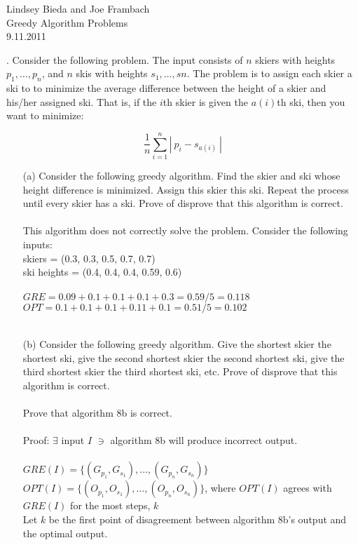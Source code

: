 \documentclass[10pt]{article}
\begin{document}
	\begin{flushright}
	Lindsey Bieda and Joe Frambach\\
	Greedy Algorithm Problems\\
	9.11.2011
	\end{flushright}
	. Consider the following problem.  The input consists of $n$ skiers with heights $p_{1}, \ldots, p_{n}$, and $n$ skis
	with heights $s_{1}, \ldots, s{n}$. The problem is to assign each skier a ski to to minimize the average difference
	between the height of a skier and his/her assigned ski. That is, if the $i$th skier is given the $a(i)$th ski,
	then you want to minimize:
	
	\[ \frac{1}{n}\sum\limits_{i=1}^n|~p_{i} - s_{a(i)}~|\]
	\begin{enumerate}
		\item[(a)] Consider the following greedy algorithm. Find the skier and ski whose height difference is minimized. 
		Assign this skier this ski. Repeat the process until every skier has a ski. Prove of disprove
		that this algorithm is correct.\\
		\\
		This algorithm does not correctly solve the problem. Consider the following inputs:\\
		skiers = (0.3, 0.3, 0.5, 0.7, 0.7)\\
		ski heights = (0.4, 0.4, 0.4, 0.59, 0.6)\\
		\\
		$GRE = 0.09 + 0.1 + 0.1 + 0.1 + 0.3 = 0.59/5 = 0.118$\\
		$OPT = 0.1 + 0.1 + 0.1 + 0.11 + 0.1 =  0.51/5 = 0.102$\\
		\\
		\item[(b)] Consider the following greedy algorithm. Give the shortest skier the shortest ski, give the second
		shortest skier the second shortest ski, give the third shortest skier the third shortest ski, etc.
		Prove of disprove that this algorithm is correct.\\
		\\
		Prove that algorithm 8b is correct.\\
		\\
		Proof: $\exists$ input $I$ $\ni$ algorithm 8b will produce incorrect output.\\
		\\
		$GRE(I) = \{(G_{p_{1}}, G_{s_{1}}), \ldots, (G_{p_{n}},G_{s_{n}})\}$\\
		$OPT(I) = \{(O_{p_{1}}, O_{s_{1}}), \ldots, (O_{p_{n}},O_{s_{n}})\}$, where $OPT(I)$ agrees with $GRE(I)$ for the most steps, $k$\\
		Let $k$ be the first point of disagreement between algorithm 8b's output and the optimal output. 


\end{enumerate}
\end{document}
